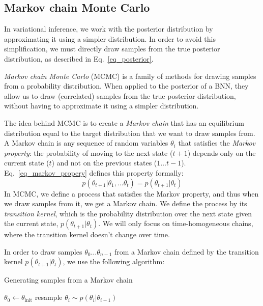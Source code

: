 \documentclass[12pt]{article}
\begin{document}
\subsection{Markov chain Monte Carlo}
\label{sec_mcmc}

In variational inference, we work with the posterior distribution by approximating it using a simpler distribution. In order to avoid this simplification, we must directly draw samples from the true posterior distribution, as described in Eq.\ \ref{eq_posterior}.

\textit{Markov chain Monte Carlo} (MCMC) is a family of methods for drawing samples from a probability distribution. When applied to the posterior of a BNN, they allow us to draw (correlated) samples from the true posterior distribution, without having to approximate it using a simpler distribution.

The idea behind MCMC is to create a \textit{Markov chain} that has an equilibrium distribution equal to the target distribution that we want to draw samples from. A Markov chain is any sequence of random variables $\theta_i$ that satisfies the \textit{Markov property}: the probability of moving to the next state ($t+1$) depends only on the current state ($t$) and not on the previous states ($1 \ldots t-1$). Eq.\ \ref{eq_markov_propery} defines this property formally:
\begin{equation}
p(\theta_{t+1}|\theta_1,\ldots \theta_t)=p(\theta_{t+1}|\theta_t)
\label{eq_markov_propery}
\end{equation}
In MCMC, we define a process that satisfies the Markov property, and thus when we draw samples from it, we get a Markov chain. We define the process by its \textit{transition kernel}, which is the probability distribution over the next state given the current state, $p(\theta_{t+1}|\theta_t)$. We will only focus on time-homogeneous chains, where the transition kernel doesn't change over time.

In order to draw samples $\theta_0 \ldots \theta_{n-1}$ from a Markov chain defined by the transition kernel $p(\theta_{t+1}|\theta_t)$, we use the following algorithm:

\begin{algorithm}
\caption{Generating samples from a Markov chain}
\label{alg_mh}
\begin{algorithmic}
\State $\theta_0 \gets \theta_{\textrm{init}}$
	\State resample $\theta_i \sim p(\theta_i|\theta_{i-1})$
\EndFor
\end{algorithmic}
\end{algorithm}
\end{document}

